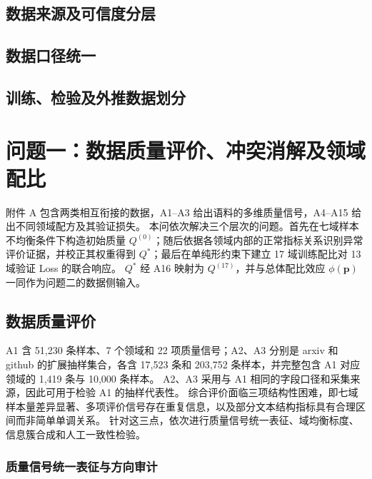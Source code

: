 \documentclass[bwprint]{gmcmthesis}
\begin{document}
\subsection{数据来源及可信度分层}

\subsection{数据口径统一}

\subsection{训练、检验及外推数据划分}

\section{问题一：数据质量评价、冲突消解及领域配比}
\label{sec:q1}

附件 A 包含两类相互衔接的数据，A1--A3 给出语料的多维质量信号，A4--A15 给出不同领域配方及其验证损失。
本问依次解决三个层次的问题。首先在七域样本不均衡条件下构造初始质量 $Q^{(0)}$；随后依据各领域内部的正常指标关系识别异常评价证据，并校正其权重得到 $Q^*$；最后在单纯形约束下建立 17 域训练配比对 13 域验证 Loss 的联合响应。
$Q^*$ 经 A16 映射为 $Q^{(17)}$，并与总体配比效应 $\phi(\mathbf p)$ 一同作为问题二的数据侧输入。

\subsection{数据质量评价}
\label{subsec:q1_quality}

A1 含 51,230 条样本、7 个领域和 22 项质量信号；A2、A3 分别是 arxiv 和 github 的扩展抽样集合，各含 17,523 条和 203,752 条样本，并完整包含 A1 对应领域的 1,419 条与 10,000 条样本。
A2、A3 采用与 A1 相同的字段口径和采集来源，因此可用于检验 A1 的抽样代表性。
综合评价面临三项结构性困难，即七域样本量差异显著、多项评价信号存在重复信息，以及部分文本结构指标具有合理区间而非简单单调关系。
针对这三点，依次进行质量信号统一表征、域均衡标度、信息簇合成和人工一致性检验。

\subsubsection{质量信号统一表征与方向审计}
\end{document}

